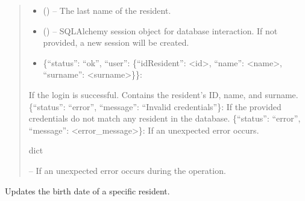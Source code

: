 \documentclass[letterpaper,10pt,english]{sphinxmanual}
\begin{document}
\begin{fulllineitems}
\begin{fulllineitems}
\begin{quote}
\begin{description}
\begin{itemize}
\item {} 
\sphinxAtStartPar
{} () – The last name of the resident.

\item {} 
\sphinxAtStartPar
{} (\sphinxstyleliteralemphasis{\sphinxupquote{, }}) – SQLAlchemy session object for database interaction.
If not provided, a new session will be created.

\end{itemize}

\sphinxAtStartPar
\begin{description}
\begin{itemize}
\item {} 
\sphinxAtStartPar
\{“status”: “ok”, “user”: \{“idResident”: <id>, “name”: <name>, “surname”: <surname>\}\}:

\end{itemize}

\sphinxAtStartPar
If the login is successful. Contains the resident’s ID, name, and surname.
\sphinxhyphen{} \{“status”: “error”, “message”: “Invalid credentials”\}:
If the provided credentials do not match any resident in the database.
\sphinxhyphen{} \{“status”: “error”, “message”: <error\_message>\}:
If an unexpected error occurs.

\end{description}


\sphinxAtStartPar
dict

\sphinxAtStartPar
{} – If an unexpected error occurs during the operation.

\end{description}\end{quote}

\end{fulllineitems}


\begin{fulllineitems}
\label{\detokenize{app.controllers:app.controllers.resident_controller.ResidentController.updateResidentBirthDate}}
\pysigstartsignatures
\pysiglinewithargsret
{}
{\sphinxparamcomma {}\sphinxparamcomma {}}
{}
\pysigstopsignatures
\sphinxAtStartPar
Updates the birth date of a specific resident.


\end{fulllineitems}
\end{fulllineitems}
\end{document}
